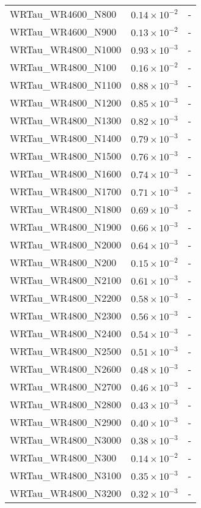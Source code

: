 \begin{longtable}[c]{| C{.35\textwidth} | C{.15\textwidth} | C{.1\textwidth}|}
    WRTau\_WR4600\_N800 & $0.14\times10^{-2}$ & - \\
    WRTau\_WR4600\_N900 & $0.13\times10^{-2}$ & - \\
    WRTau\_WR4800\_N1000 & $0.93\times10^{-3}$ & - \\
    WRTau\_WR4800\_N100 & $0.16\times10^{-2}$ & - \\
    WRTau\_WR4800\_N1100 & $0.88\times10^{-3}$ & - \\
    WRTau\_WR4800\_N1200 & $0.85\times10^{-3}$ & - \\
    WRTau\_WR4800\_N1300 & $0.82\times10^{-3}$ & - \\
    WRTau\_WR4800\_N1400 & $0.79\times10^{-3}$ & - \\
    WRTau\_WR4800\_N1500 & $0.76\times10^{-3}$ & - \\
    WRTau\_WR4800\_N1600 & $0.74\times10^{-3}$ & - \\
    WRTau\_WR4800\_N1700 & $0.71\times10^{-3}$ & - \\
    WRTau\_WR4800\_N1800 & $0.69\times10^{-3}$ & - \\
    WRTau\_WR4800\_N1900 & $0.66\times10^{-3}$ & - \\
    WRTau\_WR4800\_N2000 & $0.64\times10^{-3}$ & - \\
    WRTau\_WR4800\_N200 & $0.15\times10^{-2}$ & - \\
    WRTau\_WR4800\_N2100 & $0.61\times10^{-3}$ & - \\
    WRTau\_WR4800\_N2200 & $0.58\times10^{-3}$ & - \\
    WRTau\_WR4800\_N2300 & $0.56\times10^{-3}$ & - \\
    WRTau\_WR4800\_N2400 & $0.54\times10^{-3}$ & - \\
    WRTau\_WR4800\_N2500 & $0.51\times10^{-3}$ & - \\
    WRTau\_WR4800\_N2600 & $0.48\times10^{-3}$ & - \\
    WRTau\_WR4800\_N2700 & $0.46\times10^{-3}$ & - \\
    WRTau\_WR4800\_N2800 & $0.43\times10^{-3}$ & - \\
    WRTau\_WR4800\_N2900 & $0.40\times10^{-3}$ & - \\
    WRTau\_WR4800\_N3000 & $0.38\times10^{-3}$ & - \\
    WRTau\_WR4800\_N300 & $0.14\times10^{-2}$ & - \\
    WRTau\_WR4800\_N3100 & $0.35\times10^{-3}$ & - \\
    WRTau\_WR4800\_N3200 & $0.32\times10^{-3}$ & - \\

\end{longtable}
